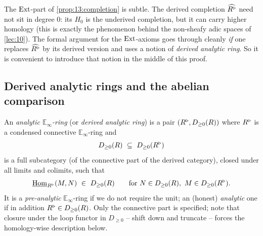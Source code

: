 \begin{remark}
\label{rmk:13:derived-needed}
The $\operatorname{Ext}$-part of \cref{prop:13:completion} is subtle. The derived completion
$\widehat{R^{\triangleright}}$ need not sit in degree $0$: its $H_0$ is the underived
completion, but it can carry higher homology (this is exactly the phenomenon
behind the non-sheafy adic spaces of \cref{lec:10}). The formal argument for the
$\operatorname{Ext}$-axioms goes through cleanly \emph{if} one replaces $\widehat{R^{\triangleright}}$ by
its derived version and uses a notion of \emph{derived analytic ring}. So it is
convenient to introduce that notion in the middle of this proof.
\end{remark}

\subsection{Derived analytic rings and the abelian comparison}

\begin{definition}
\label{def:13:derived-analytic-ring}
An \emph{analytic $\mathbb{E}_\infty$-ring} (or \emph{derived analytic ring}) is a
pair $(R^{\triangleright}, D_{\ge 0}(R))$ where $R^{\triangleright}$ is a condensed connective
$\mathbb{E}_\infty$-ring and
\begin{equation*}
D_{\ge 0}(R)\ \subseteq\ D_{\ge 0}(R^{\triangleright})
\end{equation*}
is a full subcategory (of the connective part of the derived category), closed
under all limits and colimits, such that
\begin{equation*}
\underline{\operatorname{Hom}}_{R^{\triangleright}}(M,N)\ \in\ D_{\ge 0}(R)\qquad\text{for }N\in D_{\ge 0}(R),\ M\in D_{\ge 0}(R^{\triangleright}).
\end{equation*}
It is a \emph{pre-analytic} $\mathbb{E}_\infty$-ring if we do not require the
unit; an (honest) \emph{analytic} one if in addition $R^{\triangleright}\in D_{\ge 0}(R)$.
Only the connective part is specified; note that closure under the loop functor
in $D_{\ge 0}$ -- shift down and truncate -- forces the homology-wise
description below.
\end{definition}

